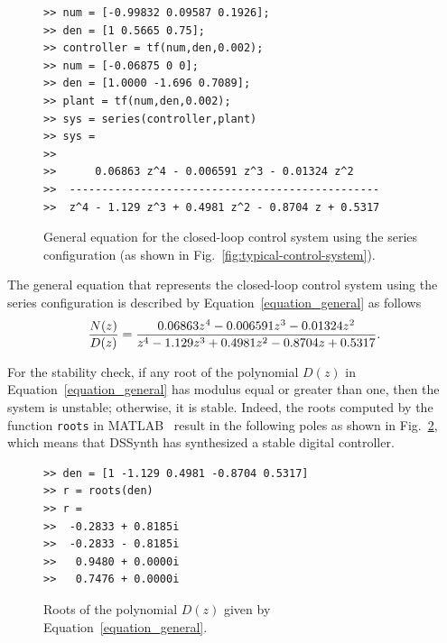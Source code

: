 \documentclass[10pt,conference]{IEEEtran}
\begin{document}
\begin{figure}[ht]
\scriptsize
\begin{lstlisting}[xleftmargin=.025\textwidth,xrightmargin=.025\textwidth, frame=single,]
>> num = [-0.99832 0.09587 0.1926];
>> den = [1 0.5665 0.75];
>> controller = tf(num,den,0.002);
>> num = [-0.06875 0 0];
>> den = [1.0000 -1.696 0.7089];
>> plant = tf(num,den,0.002);
>> sys = series(controller,plant)
>> sys =
>> 
>>      0.06863 z^4 - 0.006591 z^3 - 0.01324 z^2
>>  ------------------------------------------------
>>  z^4 - 1.129 z^3 + 0.4981 z^2 - 0.8704 z + 0.5317
\end{lstlisting}
\vspace{-0.2cm}
\caption{General equation for the closed-loop control system using the series configuration (as shown in Fig.~\ref{fig:typical-control-system}).}
\label{combine-controller-plant}
\end{figure}

The general equation that represents the closed-loop control system using the series 
configuration is described by Equation~\ref{equation_general} as follows
%
\begin{equation}
\small
\label{equation_general}
\frac{N(z)}{D(z)}=\frac{0.06863z^{4} - 0.006591z^{3} - 0.01324z^{2}}{z^{4} - 1.129z^{3} + 0.4981z^{2} -0.8704z + 0.5317}.
\end{equation}
 
For the stability check, if any root of the polynomial $D(z)$ in Equation~\ref{equation_general} 
has modulus equal or greater than one, then the system is unstable; 
otherwise, it is stable. Indeed, the roots computed by the function \texttt{roots} 
in MATLAB~\cite{matlab-toolbox} result in the following poles as shown in Fig.~\ref{roots-of-dz}, 
which means that DSSynth has synthesized a stable digital controller.

\begin{figure}[ht]
\scriptsize
\begin{lstlisting}[xleftmargin=.025\textwidth,xrightmargin=.025\textwidth, frame=single,]
>> den = [1 -1.129 0.4981 -0.8704 0.5317]
>> r = roots(den)
>> r =
>>  -0.2833 + 0.8185i
>>  -0.2833 - 0.8185i
>>   0.9480 + 0.0000i
>>   0.7476 + 0.0000i
\end{lstlisting}
\vspace{-0.2cm}
\caption{Roots of the polynomial $D(z)$ given by Equation~\ref{equation_general}.}
\label{roots-of-dz}
\end{figure}
\end{document}
